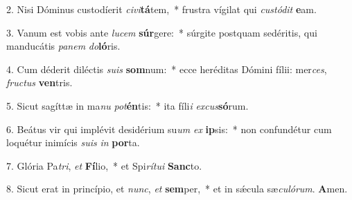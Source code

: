 2. Nisi Dóminus custodíerit \textit{ci}\textit{vi}\textbf{tá}tem,~*  frustra vígilat qui \textit{cus}\textit{tó}\textit{dit} \textbf{e}am.\

3. Vanum est vobis ante \textit{lu}\textit{cem} \textbf{súr}gere:~*  súrgite postquam sedéritis, qui manducátis \textit{pa}\textit{nem} \textit{do}\textbf{ló}ris.\

4. Cum déderit diléctis \textit{su}\textit{is} \textbf{som}num:~*  ecce heréditas Dómini fílii: mer\textit{ces}, \textit{fruc}\textit{tus} \textbf{ven}tris.\

5. Sicut sagíttæ in ma\textit{nu} \textit{pot}\textbf{én}tis:~*  ita fíli\textit{i} \textit{ex}\textit{cus}\textbf{só}rum.\

6. Beátus vir qui implévit desidérium su\textit{um} \textit{ex} \textbf{ip}sis:~*  non confundétur cum loquétur inimícis \textit{su}\textit{is} \textit{in} \textbf{por}ta.\

7. Glória Pa\textit{tri}, \textit{et} \textbf{Fí}lio,~*  et Spi\textit{rí}\textit{tu}\textit{i} \textbf{Sanc}to.\

8. Sicut erat in princípio, et \textit{nunc}, \textit{et} \textbf{sem}per,~*  et in sǽcula sæ\textit{cu}\textit{ló}\textit{rum}. \textbf{A}men.\

